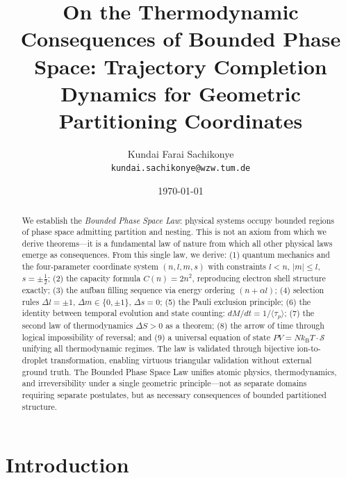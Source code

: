 \documentclass[twocolumn,10pt,a4paper]{article}
\theoremstyle{definition}
\theoremstyle{remark}
\newcommand{\kB}{k_{\mathrm{B}}}
\begin{document}
\title{\textbf{On the Thermodynamic Consequences of Bounded Phase Space: Trajectory Completion Dynamics for Geometric Partitioning Coordinates}}

\author{
Kundai Farai Sachikonye\\
\texttt{kundai.sachikonye@wzw.tum.de}
}

\date{\today}

\maketitle

\begin{abstract}
\noindent We establish the \emph{Bounded Phase Space Law}: physical systems occupy bounded regions of phase space admitting partition and nesting. This is not an axiom from which we derive theorems---it is a fundamental law of nature from which all other physical laws emerge as consequences. From this single law, we derive: (1) quantum mechanics and the four-parameter coordinate system $(n, l, m, s)$ with constraints $l < n$, $|m| \leq l$, $s = \pm\frac{1}{2}$; (2) the capacity formula $C(n) = 2n^2$, reproducing electron shell structure exactly; (3) the aufbau filling sequence via energy ordering $(n + \alpha l)$; (4) selection rules $\Delta l = \pm 1$, $\Delta m \in \{0, \pm 1\}$, $\Delta s = 0$; (5) the Pauli exclusion principle; (6) the identity between temporal evolution and state counting: $dM/dt = 1/\langle\tau_p\rangle$; (7) the second law of thermodynamics $\Delta S > 0$ as a theorem; (8) the arrow of time through logical impossibility of reversal; and (9) a universal equation of state $PV = N\kB T \cdot \mathcal{S}$ unifying all thermodynamic regimes. The law is validated through bijective ion-to-droplet transformation, enabling virtuous triangular validation without external ground truth. The Bounded Phase Space Law unifies atomic physics, thermodynamics, and irreversibility under a single geometric principle---not as separate domains requiring separate postulates, but as necessary consequences of bounded partitioned structure.
\end{abstract}


\section{Introduction}
\label{sec:introduction}
\end{document}

